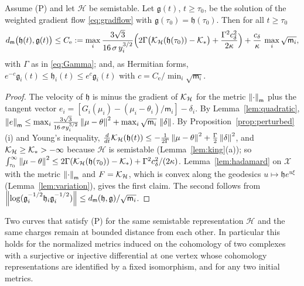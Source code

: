 \begin{theorem}\label{thm:comparison}
Assume (P) and let $\mathcal H$ be semistable. Let $\mathfrak g(t)$,
$t\geq\tau_0$, be the solution of the weighted gradient flow
\eqref{eq:gradflow} with $\mathfrak g(\tau_0)=\mathfrak h(\tau_0)$. Then for
all $t\geq\tau_0$
\[
 d_{\mathsf m}\bigl(\mathfrak h(t),\mathfrak g(t)\bigr)\leq C_{\mathrm e}
 :=\max_i\frac{3\sqrt3}{16\,\sigma\,y_i^{3/2}}\Bigl(2\Gamma\bigl(\mathcal K_{\mathcal H}(\mathfrak h(\tau_0))-\mathcal K_*\bigr)
 +\frac{\Gamma^2c_\delta^2}{2\kappa}\Bigr)
 +\frac{c_\delta}\kappa\,\max_i\sqrt{\mathsf m_i},
\]
with $\Gamma$ as in \eqref{eq:Gamma}; and, as Hermitian forms,
$e^{-c}\mathfrak g_i(t)\leq\mathfrak h_i(t)\leq e^{c}\mathfrak g_i(t)$ with
$c=C_{\mathrm e}/\min_i\sqrt{\mathsf m_i}$.
\end{theorem}

\begin{proof}
The velocity of $\mathfrak h$ is minus the gradient of $\mathcal K_{\mathcal H}$ for
the metric $\left\lVert\cdot\right\rVert_{\mathsf m}$ plus the tangent vector
$e_i=[G_i(\mu_i)-(\mu_i-\theta_i)/\mathsf m_i]-\delta_i$. By
Lemma~\ref{lem:quadratic},
$\left\lVert e\right\rVert_{\mathsf m}\leq\max_i\frac{3\sqrt3}{16\,\sigma y_i^{3/2}}\left\lVert\mu-\theta\right\rVert^2+\max_i\sqrt{\mathsf m_i}\,\left\lVert\delta\right\rVert$.
By Proposition~\ref{prop:perturbed}(i) and Young's inequality,
$\frac d{dt}\mathcal K_{\mathcal H}(\mathfrak h(t))\leq-\frac1{2\Gamma}\left\lVert\mu-\theta\right\rVert^2+\frac\Gamma2\left\lVert\delta\right\rVert^2$,
and $\mathcal K_{\mathcal H}\geq\mathcal K_*>-\infty$ because $\mathcal H$ is semistable
(Lemma~\ref{lem:king}(a)); so
$\int_{\tau_0}^\infty\left\lVert\mu-\theta\right\rVert^2\leq2\Gamma(\mathcal K_{\mathcal H}(\mathfrak h(\tau_0))-\mathcal K_*)+\Gamma^2c_\delta^2/(2\kappa)$.
Lemma~\ref{lem:hadamard} on $\mathcal X$ with the metric
$\left\lVert\cdot\right\rVert_{\mathsf m}$ and $F=\mathcal K_{\mathcal H}$, which is convex along the
geodesics $u\mapsto\mathfrak he^{u\xi}$ (Lemma~\ref{lem:variation}), gives
the first claim. The second follows from
$\left\lVert\log(\mathfrak g_i^{-1/2}\mathfrak h_i\mathfrak g_i^{-1/2})\right\rVert\leq d_{\mathsf m}(\mathfrak h,\mathfrak g)/\sqrt{\mathsf m_i}$.
\end{proof}

\begin{corollary}\label{cor:presentations}
Two curves that satisfy (P) for the same semistable representation
$\mathcal H$ and the same charges remain at bounded distance from each
other. In particular this holds for the normalized metrics induced on the
cohomology of two complexes with a surjective or injective differential at
one vertex whose cohomology representations are identified by a fixed
isomorphism, and for any two initial metrics.
\end{corollary}

